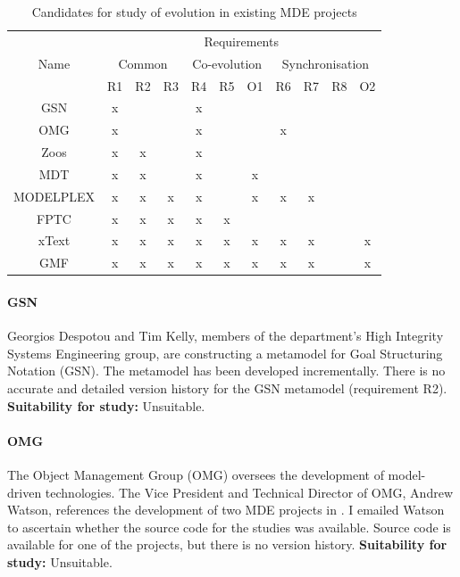 \begin{table}
	\caption{Candidates for study of evolution in existing MDE projects}
	\centering
	\begin{tabular}{|c||c|c|c||c|c|c||c|c|c|c|}
		\hline
		\multirow{3}{*}{Name} & \multicolumn{10}{|c|}{Requirements} \\
		\cline{2-11}
		          & \multicolumn{3}{|c||}{Common} & \multicolumn{3}{|c||}{Co-evolution} & \multicolumn{4}{|c|}{Synchronisation} \\
		\cline{2-11}
		          & R1 & R2 & R3 & R4 & R5 & O1 & R6 & R7 & R8 & O2 \\
		\hline
		GSN       & x  &    &    & x  &    &    &    &    &    &    \\
		\hline
		OMG       & x  &    &    & x  &    &    & x  &    &    &    \\
		\hline
		Zoos      & x  & x  &    & x  &    &    &    &    &    &    \\
		\hline
		MDT       & x  & x  &    & x  &    & x  &    &    &    &    \\
		\hline
		MODELPLEX & x  & x  & x  & x  &    & x  & x  & x  &    &    \\
		\hline
		FPTC      & x  & x  & x  & x  & x  &    &    &    &    &    \\
		\hline
		xText     & x  & x  & x  & x  & x  & x  & x  & x  &    & x  \\
		\hline
		GMF       & x  & x  & x  & x  & x  & x  & x  & x  &    & x  \\
		\hline
	\end{tabular}
	\label{tab:candidates}
\end{table}

\paragraph{GSN} %
\label{par:gsn}
Georgios Despotou and Tim Kelly, members of the department's High Integrity Systems Engineering group, are constructing a metamodel for Goal Structuring Notation (GSN). The metamodel has been developed incrementally. There is no accurate and detailed version history for the GSN metamodel (requirement R2). \textbf{Suitability for study:} Unsuitable.

\paragraph{OMG} %
\label{par:omg}
The Object Management Group (OMG) \cite{omg} oversees the development of model-driven technologies. The Vice President and Technical Director of OMG, Andrew Watson, references the development of two MDE projects in \cite{watson08mdahistory}. I emailed Watson to ascertain whether the source code for the studies was available. Source code is available for one of the projects, but there is no version history. \textbf{Suitability for study:} Unsuitable.

